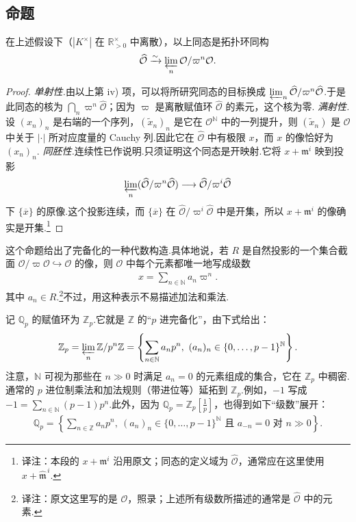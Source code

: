 \subsection{命题}\label{sec:nt-4-2-2}
\begin{proposition*}
在上述假设下（$|K^\times|$ 在 $\mathbb R_{>0}^\times$ 中离散），以上同态是拓扑环同构
\begin{align*}
\widehat{\mathcal O}\xrightarrow{\sim}\varprojlim_n\mathcal O/\varpi^n\mathcal O.
\end{align*}
\end{proposition*}
\begin{proof}
\emph{单射性.}由以上第 iv) 项，可以将所研究同态的目标换成 $\varprojlim_n\widehat{\mathcal O}/\varpi^n\widehat{\mathcal O}$.于是此同态的核为 $\bigcap_n\varpi^n\widehat{\mathcal O}$；因为 $\varpi$ 是离散赋值环 $\widehat{\mathcal O}$ 的素元，这个核为零.
\emph{满射性.}设 $(x_n)_n$ 是右端的一个序列，$(\widetilde x_n)_n$ 是它在 $\mathcal O^{\mathbb N}$ 中的一列提升，则 $(\widetilde x_n)$ 是 $\mathcal O$ 中关于 $|\cdot|$ 所对应度量的 Cauchy 列.因此它在 $\widehat{\mathcal O}$ 中有极限 $x$，而 $x$ 的像恰好为 $(x_n)_n$.
\emph{同胚性.}连续性已作说明.只须证明这个同态是开映射.它将 $x+\mathfrak m^i$ 映到投影
\begin{align*}
\varprojlim_n(\widehat{\mathcal O}/\varpi^n\widehat{\mathcal O})\longrightarrow\widehat{\mathcal O}/\varpi^i\widehat{\mathcal O}
\end{align*}
下 $\{\overline x\}$ 的原像.这个投影连续，而 $\{\overline x\}$ 在 $\widehat{\mathcal O}/\varpi^i\widehat{\mathcal O}$ 中是开集，所以 $x+\mathfrak m^i$ 的像确实是开集.\footnote{译注：本段的 $x+\mathfrak m^i$ 沿用原文；同态的定义域为 $\widehat{\mathcal O}$，通常应在这里使用 $x+\widehat{\mathfrak m}^{\,i}$.}
\end{proof}
这个命题给出了完备化的一种代数构造.具体地说，若 $R$ 是自然投影的一个集合截面\linebreak
$\mathcal O/\varpi\mathcal O\hookrightarrow\mathcal O$ 的像，则 $\mathcal O$ 中每个元素都唯一地写成级数
\begin{align*}
x=\sum_{n\in\mathbb N}a_n\varpi^n.
\end{align*}
其中 $a_n\in R$.\footnote{译注：原文这里写的是 $\mathcal O$，照录；上述所有级数所描述的通常是 $\widehat{\mathcal O}$ 中的元素.}不过，用这种表示不易描述加法和乘法.
\begin{example*}
记 $\mathbb Q_p$ 的赋值环为 $\mathbb Z_p$.它就是 $\mathbb Z$ 的``$p$ 进完备化''，由下式给出：
\begin{align*}
\mathbb Z_p=\varprojlim_n\mathbb Z/p^n\mathbb Z
=\left\{\sum_{n\in\mathbb N}a_np^n,\ (a_n)_n\in\{0,\ldots,p-1\}^{\mathbb N}\right\}.
\end{align*}
注意，$\mathbb N$ 可视为那些在 $n\gg0$ 时满足 $a_n=0$ 的元素组成的集合，它在 $\mathbb Z_p$ 中稠密.通常的 $p$ 进位制乘法和加法规则（带进位等）延拓到 $\mathbb Z_p$.例如，$-1$ 写成 $-1=\sum_{n\in\mathbb N}(p-1)p^n$.此外，因为 $\mathbb Q_p=\mathbb Z_p[\frac1p]$，也得到如下``级数''展开：
\begin{align*}
\mathbb Q_p=\left\{\sum_{n\in\mathbb Z}a_np^n,\ (a_n)_n\in\{0,\ldots,p-1\}^{\mathbb N}\text{ 且 }a_{-n}=0\text{ 对 }n\gg0\right\}.
\end{align*}
\end{example*}
